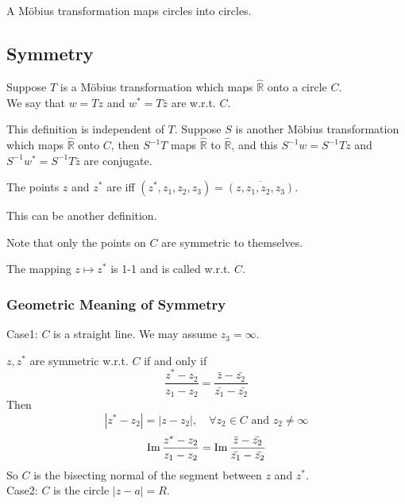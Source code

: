 \begin{theorem}
    A M{\"o}bius transformation maps circles into circles.
\end{theorem}
\subsection{Symmetry}
Suppose  $ T  $ is a M{\"o}bius transformation which maps  $ \hat{\mathbb{R}}  $ onto a circle  $ C $. \\
We say that  $ w=Tz  $ and  $ w^*=T\bar{z} $ are  w.r.t.  $ C $.
\begin{remark}
    This definition is independent of  $ T $. Suppose  $ S  $ is another M{\"o}bius transformation which maps  $ \hat{\mathbb{R}} $ onto  $ C $, then  $ S^{-1}T $ maps  $ \hat{\mathbb{R}} $ to  $ \hat{\mathbb{R}} $, and this  $ S^{-1}w=S^{-1}Tz $ and  $ S^{-1}w^*=S^{-1}T\bar{z} $ are conjugate.       
\end{remark}  
The points  $ z  $ and  $ z^* $ are  iff  $ (z^*,z_1,z_2,z_3)=\overline{(z,z_1,z_2,z_3)} $.

This can be another definition. 

Note that only the points on  $ C  $ are symmetric to themselves.

The mapping  $ z\mapsto z^* $ is 1-1 and is called  w.r.t. $ C $.

\subsubsection{Geometric Meaning of Symmetry} 
Case1:  $ C  $ is a straight line. We may assume  $ z_3=\infty $. 

 $ z,z^* $ are symmetric w.r.t.  $ C $ if and only if 
 \[\frac{z^*-z_2}{z_1-z_2}=\frac{\bar{z}-\bar{z_2}}{\bar{z_1}-\bar{z_2}}\]
 Then 
 \[|z^*-z_2|=|z-z_2|,\quad \forall z_2\in C\text{ and }z_2\not=\infty\]
 \[\operatorname{Im}\frac{z^*-z_2}{z_1-z_2}=\operatorname{Im}\frac{\bar{z}-\bar{z_2}}{\bar{z_1}-\bar{z_2}}\]   
 So  $ C  $ is the bisecting normal of the segment between  $ z  $ and  $ z^
 * $.\\
 Case2: $ C  $ is the circle  $ |z-a|=R $.
 
